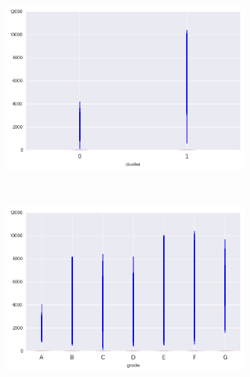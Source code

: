 \begin{apendicesenv}
\begin{figure}[t!]
\begin{subfigure}[t]{0.5\textwidth}
			\centerline{\includegraphics[width=1.05\textwidth]{img/out_prncp_by_cluster}}
    	\end{subfigure}%
    	~ 
    	\begin{subfigure}[t]{0.5\textwidth}
    		\centering
   
			\centerline{\includegraphics[width=1.05\textwidth]{img/out_prncp_by_grade}}

    	\end{subfigure}
\end{figure}


\begin{figure}[t!]
    \centering
        \caption{total\textunderscore pymnt }
    	\begin{subfigure}[t]{0.5\textwidth}
    		\centering


\end{subfigure}
\end{figure}
\end{apendicesenv}
